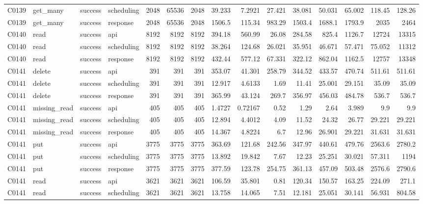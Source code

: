 \begin{landscape}
\begin{longtable}{llllrrrrrrrrrrr}
C0139 & get\_\allowbreak{}many & success & scheduling & 2048 & 65536 & 2048 & 39.233 & 7.2921 & 27.421 & 38.081 & 50.031 & 65.002 & 118.45 & 128.26\\
C0139 & get\_\allowbreak{}many & success & response & 2048 & 65536 & 2048 & 1506.5 & 115.34 & 983.29 & 1503.4 & 1688.1 & 1793.9 & 2035 & 2464\\
C0140 & read & success & api & 8192 & 8192 & 8192 & 394.18 & 560.99 & 26.08 & 284.58 & 825.4 & 1126.7 & 12724 & 13315\\
C0140 & read & success & scheduling & 8192 & 8192 & 8192 & 38.264 & 124.68 & 26.021 & 35.951 & 46.671 & 57.471 & 75.052 & 11312\\
C0140 & read & success & response & 8192 & 8192 & 8192 & 432.44 & 577.12 & 67.331 & 322.12 & 862.04 & 1162.5 & 12757 & 13348\\
C0141 & delete & success & api & 391 & 391 & 391 & 353.07 & 41.301 & 258.79 & 344.52 & 433.57 & 470.74 & 511.61 & 511.61\\
C0141 & delete & success & scheduling & 391 & 391 & 391 & 12.917 & 4.6133 & 1.69 & 11.41 & 25.001 & 29.151 & 35.09 & 35.09\\
C0141 & delete & success & response & 391 & 391 & 391 & 365.99 & 43.124 & 269.7 & 356.97 & 456.03 & 484.78 & 536.7 & 536.7\\
C0141 & missing\_\allowbreak{}read & success & api & 405 & 405 & 405 & 1.4727 & 0.72167 & 0.52 & 1.29 & 2.64 & 3.989 & 9.9 & 9.9\\
C0141 & missing\_\allowbreak{}read & success & scheduling & 405 & 405 & 405 & 12.894 & 4.4012 & 4.09 & 11.52 & 24.32 & 26.77 & 29.221 & 29.221\\
C0141 & missing\_\allowbreak{}read & success & response & 405 & 405 & 405 & 14.367 & 4.8224 & 6.7 & 12.96 & 26.901 & 29.221 & 31.631 & 31.631\\
C0141 & put & success & api & 3775 & 3775 & 3775 & 363.69 & 121.68 & 242.56 & 347.97 & 440.61 & 479.76 & 2563.6 & 2780.2\\
C0141 & put & success & scheduling & 3775 & 3775 & 3775 & 13.892 & 19.842 & 7.67 & 12.23 & 25.251 & 30.021 & 57.311 & 1194\\
C0141 & put & success & response & 3775 & 3775 & 3775 & 377.59 & 123.78 & 254.75 & 361.13 & 457.09 & 503.48 & 2576.6 & 2790.6\\
C0141 & read & success & api & 3621 & 3621 & 3621 & 106.59 & 35.801 & 0.81 & 120.34 & 150.57 & 163.25 & 224.09 & 271.1\\
C0141 & read & success & scheduling & 3621 & 3621 & 3621 & 13.758 & 14.065 & 7.51 & 12.181 & 25.051 & 30.141 & 56.931 & 804.58\\

\end{longtable}
\end{landscape}
